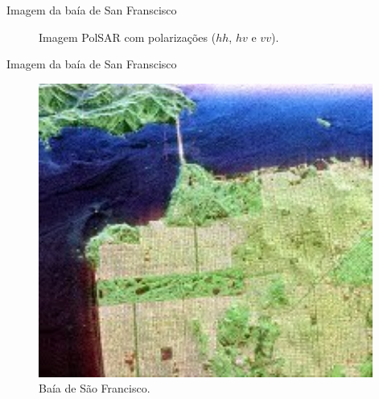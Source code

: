 \documentclass[10pt]{beamer}
\begin{document}
\begin{frame}{Imagem da baía de San Franscisco}
\begin{figure}[hbt]
\endminipage
	\caption{Imagem PolSAR com polarizações ($hh$, $hv$ e $vv$).}
\end{figure}
\end{frame}

\begin{frame}{Imagem da baía de San Franscisco}
\begin{figure}[hbt]
\includegraphics[scale=0.85]{polsar_teste.pdf}
\caption{Baía de São Francisco.}
\end{figure}
\end{frame}
\end{document}
